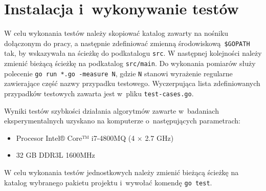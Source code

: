 \section{Instalacja i~wykonywanie testów}
\par{
  W celu wykonania testów należy skopiować katalog zawarty na nośniku dołączonym do pracy, a następnie zdefiniować zmienną środowiskową \texttt{\$GOPATH} tak, by wskazywała na ścieżkę do podkatalogu \texttt{src}.
  W następnej kolejności należy zmienić bieżącą ścieżkę na podkatalog \texttt{src/main}.
  Do wykonania pomiarów służy polecenie \texttt{go run *.go -measure N}, gdzie \texttt{N} stanowi wyrażenie regularne zawierające część nazwy przypadku testowego.
  Wyczerpująca lista zdefiniowanych przypadków testowych zawarta jest w~pliku \texttt{test-cases.go}.

  Wyniki testów szybkości działania algorytmów zawarte w~badaniach eksperymentalnych uzyskano na komputerze o~następujących parametrach:
  \begin{itemize}
    \item Procesor Intel® Core™ i7-4800MQ (4 $\times$ 2.7 GHz)
    \item 32 GB DDR3L 1600MHz
  \end{itemize}

  W celu wykonania testów jednostkowych należy zmienić bieżącą ścieżkę na katalog wybranego pakietu projektu i~wywołać komendę \texttt{go test}.
}
